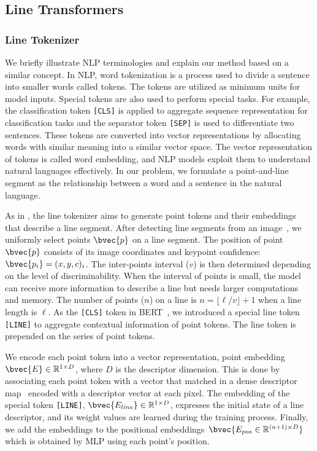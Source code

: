 \documentclass[letterpaper, 10 pt, journal, twoside]{ieeetran}
\begin{document}
\subsection{Line Transformers}

\subsubsection{Line Tokenizer}

We briefly illustrate \ac{NLP} terminologies and explain our method based on a similar concept. In \ac{NLP}, word tokenization is a process used to divide a sentence into smaller words called tokens. The tokens are utilized as minimum units for model inputs. Special tokens are also used to perform special tasks. For example, the classification token \texttt{[CLS]} is applied to aggregate sequence representation for classification tasks and the separator token \texttt{[SEP]} is used to differentiate two sentences. These tokens are converted into vector representations by allocating words with similar meaning into a similar vector space. The vector representation of tokens is called word embedding, and \ac{NLP} models exploit them to understand natural languages effectively. In our problem, we formulate a point-and-line segment as the relationship between a word and a sentence in the natural language.

As in , the line tokenizer aims to generate point tokens and their embeddings that describe a line segment. After detecting line segments from an image~\cite{Gioi2010}, we uniformly select points $\bvec{p}$ on a line segment. The position of point $\bvec{p}$ consists of its image coordinates and keypoint confidence: $\bvec{p_i} = (x,y,c)_i$. The inter-points interval ($v$) is then determined depending on the level of discriminability. When the interval of points is small, the model can receive more information to describe a line but needs larger computations and memory. The number of points ($n$) on a line is $n = \lfloor\ell/v\rfloor+1$ when a line length is $\ell$. As the \texttt{[CLS]} token in BERT~\cite{Devlin2018}, we introduced a special line token \texttt{[LINE]} to aggregate contextual information of point tokens. The line token is prepended on the series of point tokens.

We encode each point token into a vector representation, point embedding~$\bvec{E}\in\mathbb{R}^{1 \times D}$, where $D$ is the descriptor dimension. This is done by associating each point token with a vector that matched in a dense descriptor map~\cite{DeTone2017} encoded with a descriptor vector at each pixel. The embedding of the special token \texttt{[LINE]}, $\bvec{E_{line}}\in\mathbb{R}^{1 \times D}$, expresses the initial state of a line descriptor, and its weight values are learned during the training process. Finally, we add the embeddings to the positional embeddings~$\bvec{E_{pos}\in\mathbb{R}^{(n+1) \times D}}$ which is obtained by \ac{MLP} using each point's position.
\end{document}
